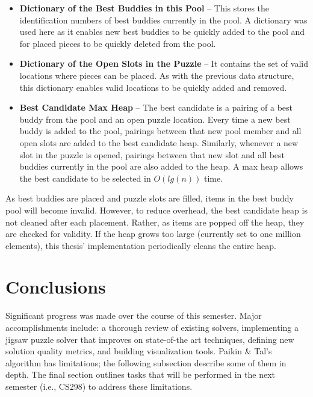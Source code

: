 \documentclass{report}
\begin{document}
\begin{itemize}

	\item \textbf{Dictionary of the Best Buddies in this Pool} -- This stores the identification numbers of best buddies currently in the pool.  A dictionary was used here as it enables new best buddies to be quickly added to the pool and for placed pieces to be quickly deleted from the pool.
	
	\item \textbf{Dictionary of the Open Slots in the Puzzle} -- It contains the set of valid locations where pieces can be placed.  As with the previous data structure, this dictionary enables valid locations to be quickly added and removed.

	\item \textbf{Best Candidate Max Heap} -- The best candidate is a pairing of a best buddy from the pool and an open puzzle location.  Every time a new best buddy is added to the pool, pairings between that new pool member and all open slots are added to the best candidate heap.  Similarly, whenever a new slot in the puzzle is opened, pairings between that new slot and all best buddies currently in the pool are also added to the heap.  A max heap allows the best candidate to be selected in $O(lg(n))$ time.
	
\end{itemize}

As best buddies are placed and puzzle slots are filled, items in the best buddy pool will become invalid.  However, to reduce overhead, the best candidate heap is not cleaned after each placement.  Rather, as items are popped off the heap, they are checked for validity. If the heap grows too large (currently set to one million elements), this thesis' implementation periodically cleans the entire heap.







\pagebreak
\section{Conclusions}\label{sec:conclusions}

Significant progress was made over the course of this semester.  Major accomplishments include: a thorough review of existing solvers, implementing a jigsaw puzzle solver that improves on state-of-the art techniques, defining new solution quality metrics, and building visualization tools.  Paikin \& Tal's algorithm has limitations; the following subsection describe some of them in depth.  The final section outlines tasks that will be performed in the next semester (i.e., CS298) to address these limitations.
\end{document}
